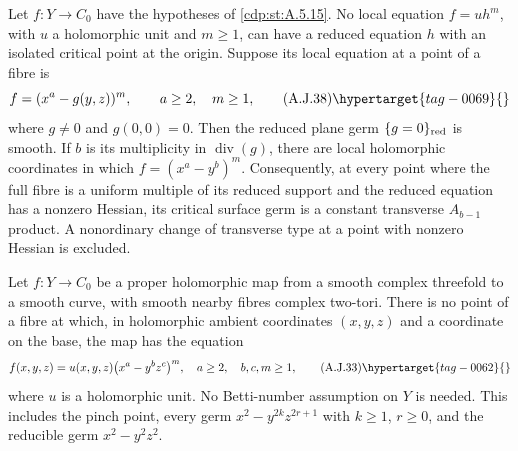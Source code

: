 
\begin{proposition}\hypertarget{tag-01B7}{}\label{cdp:st:A.5.17}


Let $f:Y\to C_0$ have the hypotheses of \ref{cdp:st:A.5.15}.
No local equation $f=u h^m$, with $u$ a holomorphic
unit and $m\ge1$, can have a reduced equation $h$
with an isolated critical point at the origin.
Suppose its local equation at a point of a fibre is
\[
             f=(x^a-g(y,z))^m,
             \qquad a\ge2,\quad m\ge1,             \tag{A.J.38}\hypertarget{tag-0069}{}\label{cdp:eq:A.J.38}
\]
where $g\ne0$ and $g(0,0)=0$. Then the reduced
plane germ $\{g=0\}_{\rm red}$ is smooth. If
$b$ is its multiplicity in $\operatorname{div}(g)$,
there are local holomorphic coordinates in which
$f=(x^a-y^b)^m$.
Consequently, at every point where the full fibre
is a uniform multiple of its reduced support and
the reduced equation has a nonzero Hessian, its
critical surface germ is a constant
transverse $A_{b-1}$ product. A nonordinary change
of transverse type at a point with nonzero Hessian
is excluded.
\end{proposition}

\begin{proposition}\hypertarget{tag-01B5}{}\label{cdp:st:A.5.15}


Let $f:Y\to C_0$ be a proper holomorphic map from a
smooth complex threefold to a smooth curve, with smooth
nearby fibres complex two-tori. There is no point of
a fibre at which, in holomorphic ambient coordinates
$(x,y,z)$ and a coordinate on the base, the map has
the equation
\[
 f(x,y,z)=u(x,y,z)\bigl(x^a-y^bz^c\bigr)^m,
 \quad a\ge2,\quad b,c,m\ge1,                                    \tag{A.J.33}\hypertarget{tag-0062}{}\label{cdp:eq:A.J.33}
\]
where $u$ is a holomorphic unit. No Betti-number
assumption on $Y$ is needed. This includes the pinch
point, every germ $x^2-y^{2k}z^{2r+1}$ with
$k\ge1$, $r\ge0$, and the reducible germ
$x^2-y^2z^2$.
\end{proposition}

